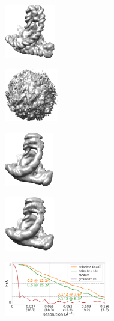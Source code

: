 \begin{figure}[t]
    \begin{subfigure}[b]{0.15\linewidth}
        \centering
        \includegraphics[height=2.35cm]{figures/5j0n_fullcvg_uniformS2_noise0_gt.png}
        \caption{}\label{fig:5j0n-noise0-reconstruction-true}
    \end{subfigure}
    \hfill
    \begin{subfigure}[b]{0.15\linewidth}
        \centering
        \includegraphics[height=2.3cm]{figures/5j0n_fullcvg_uniformS2_noise0_rand.png}
        \caption{}
    \end{subfigure}
    \hfill
    \begin{subfigure}[b]{0.15\linewidth}
        \centering
        \includegraphics[height=2.35cm]{figures/5j0n_fullcvg_uniformS2_noise0_apr.png}
        \caption{}\label{fig:5j0n-noise0-reconstruction-recovered}
    \end{subfigure}
    \hfill
    \begin{subfigure}[b]{0.15\linewidth}
        \centering
        \includegraphics[height=2.35cm]{figures/5j0n_fullcvg_uniformS2_noise16_apr.png}
        \caption{}\label{fig:5j0n-noise16-reconstruction-recovered}
    \end{subfigure}
    \hfill
    \begin{subfigure}[b]{0.33\linewidth}
        \centering
        \includegraphics[height=2.4cm]{figures/5j0n_fullcvg_uniformS2_FSC_apr_init_customFSC2.pdf}
        \caption{}\label{fig:5j0n-reconstruction-fsc}
    \end{subfigure}


\end{figure}
